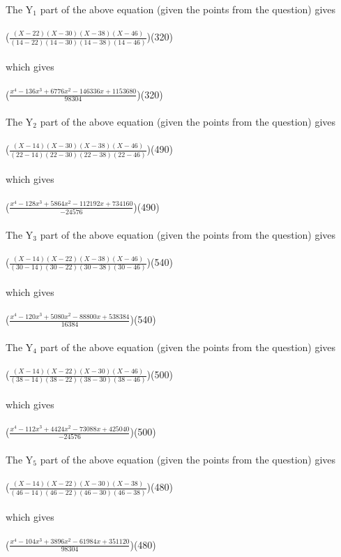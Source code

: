 \documentclass{article}
\begin{document}
	The Y$_1$ part of the above equation (given the points from the question) gives\\\\
	($\frac{(X - 22)(X - 30)(X - 38)(X - 46)}{(14 - 22)(14 - 30)(14 - 38)(14 - 46)}$)(320)\\\\
	which gives \\\\
	($\frac{x^4 - 136x^3 + 6776x^2 - 146336x + 1153680}{98304}$)(320)\\\\
	
	The Y$_2$ part of the above equation (given the points from the question) gives\\\\
	($\frac{(X - 14)(X - 30)(X - 38)(X - 46)}{(22 - 14)(22 - 30)(22 - 38)(22 - 46)}$)(490)\\\\
	which gives \\\\
	($\frac{x^4 - 128x^3 + 5864x^2 - 112192x + 734160}{-24576}$)(490)\\\\
	
	The Y$_3$ part of the above equation (given the points from the question) gives\\\\
	($\frac{(X - 14)(X - 22)(X - 38)(X - 46)}{(30 - 14)(30 - 22)(30 - 38)(30 - 46)}$)(540)\\\\
	which gives \\\\
	($\frac{x^4 - 120x^3 + 5080x^2 - 88800x + 538384}{16384}$)(540)\\\\
	
	The Y$_4$ part of the above equation (given the points from the question) gives\\\\
	($\frac{(X - 14)(X - 22)(X - 30)(X - 46)}{(38 - 14)(38 - 22)(38 - 30)(38 - 46)}$)(500)\\\\
	which gives \\\\
	($\frac{x^4 - 112x^3 + 4424x^2 - 73088x + 425040}{-24576}$)(500)\\\\
	
	The Y$_5$ part of the above equation (given the points from the question) gives\\\\
	($\frac{(X - 14)(X - 22)(X - 30)(X - 38)}{(46 - 14)(46 - 22)(46 - 30)(46 - 38)}$)(480)\\\\
	which gives \\\\
	($\frac{x^4 - 104x^3 + 3896x^2 - 61984x + 351120}{98304}$)(480)\\\\\\
	
\end{document}
